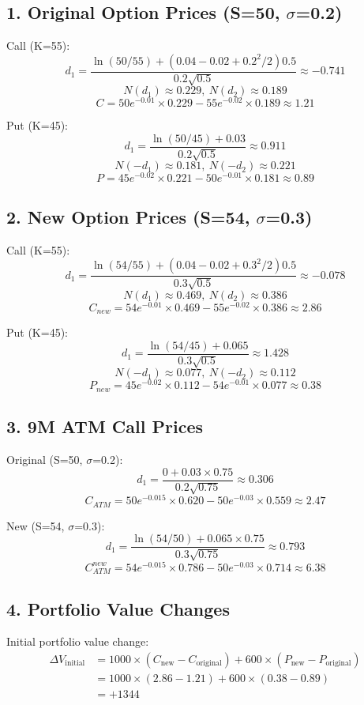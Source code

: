 \documentclass{article}
\begin{document}
\subsection*{1. Original Option Prices (S=50, $\sigma$=0.2)}

Call (K=55):
\[
d_1 = \frac{\ln(50/55)+(0.04-0.02+0.2^2/2)0.5}{0.2\sqrt{0.5}} \approx -0.741
\]
\[
N(d_1) \approx 0.229,\ N(d_2) \approx 0.189
\]
\[
C = 50e^{-0.01}\times0.229 - 55e^{-0.02}\times0.189 \approx 1.21
\]

Put (K=45):
\[
d_1 = \frac{\ln(50/45)+0.03}{0.2\sqrt{0.5}} \approx 0.911
\]
\[
N(-d_1) \approx 0.181,\ N(-d_2) \approx 0.221
\]
\[
P = 45e^{-0.02}\times0.221 - 50e^{-0.01}\times0.181 \approx 0.89
\]

\subsection*{2. New Option Prices (S=54, $\sigma$=0.3)}

Call (K=55):
\[
d_1 = \frac{\ln(54/55)+(0.04-0.02+0.3^2/2)0.5}{0.3\sqrt{0.5}} \approx -0.078
\]
\[
N(d_1) \approx 0.469,\ N(d_2) \approx 0.386
\]
\[
C_{new} = 54e^{-0.01}\times0.469 - 55e^{-0.02}\times0.386 \approx 2.86
\]

Put (K=45):
\[
d_1 = \frac{\ln(54/45)+0.065}{0.3\sqrt{0.5}} \approx 1.428
\]
\[
N(-d_1) \approx 0.077,\ N(-d_2) \approx 0.112
\]
\[
P_{new} = 45e^{-0.02}\times0.112 - 54e^{-0.01}\times0.077 \approx 0.38
\]

\subsection*{3. 9M ATM Call Prices}

Original (S=50, $\sigma$=0.2):
\[
d_1 = \frac{0+0.03\times0.75}{0.2\sqrt{0.75}} \approx 0.306
\]
\[
C_{ATM} = 50e^{-0.015}\times0.620 - 50e^{-0.03}\times0.559 \approx 2.47
\]

New (S=54, $\sigma$=0.3):
\[
d_1 = \frac{\ln(54/50)+0.065\times0.75}{0.3\sqrt{0.75}} \approx 0.793
\]
\[
C_{ATM}^{new} = 54e^{-0.015}\times0.786 - 50e^{-0.03}\times0.714 \approx 6.38
\]

\subsection*{4. Portfolio Value Changes}

Initial portfolio value change:
\begin{align*}
\Delta V_{\text{initial}} &= 1000 \times (C_{\text{new}} - C_{\text{original}}) + 600 \times (P_{\text{new}} - P_{\text{original}}) \\
&= 1000 \times (2.86 - 1.21) + 600 \times (0.38 - 0.89) \\
&= +1344
\end{align*}
\end{document}
